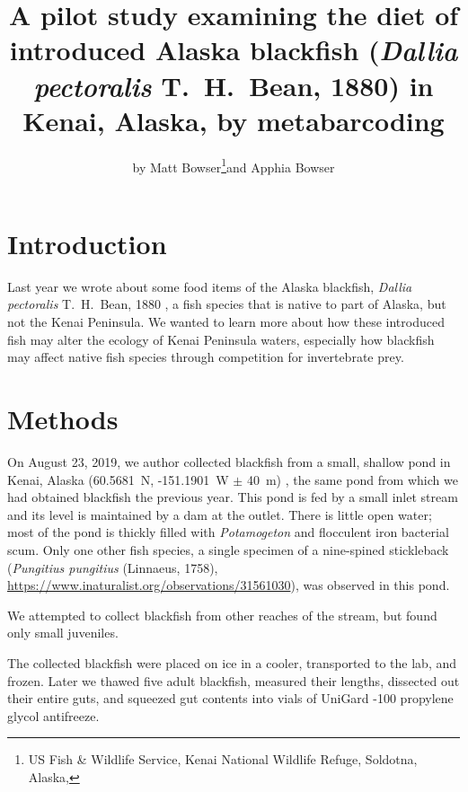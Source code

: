 \title{A pilot study examining the diet of introduced Alaska blackfish (\textit{Dallia pectoralis} T.\ H.\ Bean, 1880) in Kenai, Alaska, by metabarcoding}

\subtitle{}

\author{by Matt Bowser\footnote{US Fish \& Wildlife Service, Kenai National Wildlife Refuge, Soldotna, Alaska, }and Apphia Bowser}

\maketitle

\section{Introduction}

Last year we  wrote about some food items of the Alaska blackfish, \textit{Dallia pectoralis} T.\ H.\ Bean, 1880 \citep{Bowseretal2019},  a fish species that is native to part of Alaska, but not the Kenai Peninsula. We wanted to learn more about how these introduced fish may alter the ecology of Kenai Peninsula waters, especially how blackfish may affect native fish species through competition for invertebrate prey.

\section{Methods}

On August 23, 2019, we author collected blackfish from a small, shallow pond in Kenai, Alaska (60.5681~\textdegree{}N, -151.1901~\textdegree{}W $\pm$ 40~m) \citep{bowser2019}, the same pond from which we had obtained blackfish the previous year. This pond is fed by a small inlet stream and its level is maintained by a dam at the outlet. There is little open water; most of the pond is thickly filled with \textit{Potamogeton} and flocculent iron bacterial scum. Only one other fish species, a single specimen of a nine-spined stickleback (\textit{Pungitius pungitius} (Linnaeus, 1758),  
\url{https://www.inaturalist.org/observations/31561030}), was observed in this pond.

We attempted to collect blackfish from other reaches of the stream, but found only small juveniles. 

The collected blackfish were placed on ice in a cooler, transported to the lab, and frozen. Later we thawed five adult blackfish, measured their lengths, dissected out their entire guts, and squeezed gut contents into vials of UniGard -100 propylene glycol antifreeze.

